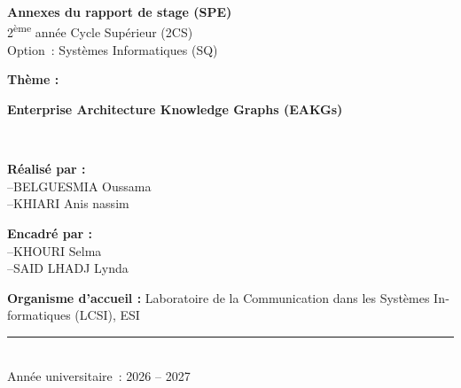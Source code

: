 \begin{titlepage}
\begin{french}
{\Large\bfseries Annexes du rapport de stage (SPE)}\\[0.3cm]
{\large 2\textsuperscript{ème} année Cycle Supérieur (2CS)}\\[1cm]

{\large Option~: Systèmes Informatiques (SQ)\\}
\vspace{1cm}

\begin{center}

\begin{minipage}{0.9\linewidth}
\centering
{\Large \textbf{Thème :}\par}
{\Large\bfseries Enterprise Architecture Knowledge Graphs (EAKGs)\par}

\end{minipage}

\end{center}
\vspace{3cm}

\ \begin{minipage}[t]{0.45\textwidth}
        \begin{flushleft} \large
            \textbf{Réalisé par :}\\
            \vspace{0.2cm}
            --BELGUESMIA Oussama \\
            --KHIARI Anis nassim
        \end{flushleft}
    \end{minipage}
    \hfill
    \begin{minipage}[t]{0.45\textwidth}
        \begin{flushleft} \large
            \textbf{Encadré par :}\\
            \vspace{0.2cm}
                --KHOURI Selma\\
                --SAID LHADJ Lynda
        \end{flushleft}
    \end{minipage}\par\vspace{1cm}

    \begin{flushleft} \large
        \textbf{Organisme d'accueil :} Laboratoire de la Communication dans les Systèmes Informatiques (LCSI), ESI
    \end{flushleft}

    \vfill  
    \rule{0.75\linewidth}{0.3mm} \\[0.5cm]
    {\large Année universitaire~: 2026 -- 2027}\\[1.5cm]
    
\end{french}
\end{titlepage} 